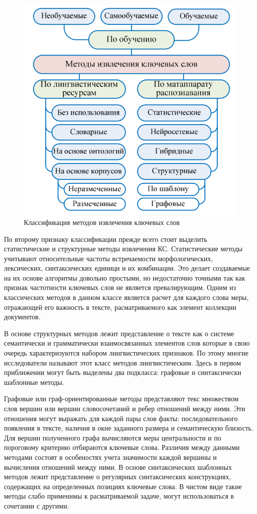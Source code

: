 \begin{figure}[h!]
	\centering
	\includegraphics[width=0.7\linewidth]{src/img/ke_types}
	\caption[]{Классификация методов извлечения ключевых слов}
	\label{fig:ketypes}
\end{figure}

По второму признаку классификации прежде всего стоит выделить статистические и структурные методы извлечения КС.
Статистические методы учитывают относительные частоты встречаемости морфологических, лексических, синтаксических единици и их комбинации.
Это делает создаваемые на их основе алгоритмы довольно простыми, но недостаточно точными так как признак частотности ключевых слов не является превалирующим.
Одним из классических методов в данном классе является расчет для каждого слова меры, отражающей его важность в тексте, расматриваемого как элемент коллекции документов.

В основе структурных методов лежит представление о тексте как о системе семантически и грамматически взаимосвязанных элементов слов которые в свою очередь характеризуются набором лингвистических признаков.
По этому многие исследователи называют этот класс методов лингвистическим.
Здесь в первом приближении могут быть выделены два подкласса: графовые и синтаксически шаблонные методы.

Графовые или граф-ориентированные методы представляют текс множеством слов вершин или вершин словосочетаний и ребер отношений между ними.
Эти отношения могут выражать для каждой пары слов факты: последовательного появления в тексте, наличия в окне заданного размера и семантическую близость.
Для вершин полученного графа вычисляются меры центральности и по пороговому критерию отбираются ключевые слова.
Различия между данными методами состоят в особеностях учета значимости каждой вершины и вычисления отношений между ними.
В основе синтаксических шаблонных методов лежит представление о регулярных синтаксических конструкциях, содержащих на определенных позициях ключевые слова.
В чистом виде такие методы слабо применимы к расматриваемой задаче, могут использоваться в сочетании с другими.

